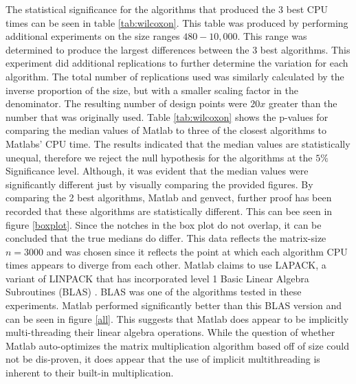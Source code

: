 \documentclass[sigconf]{acmart}
\begin{document}
The statistical significance for the algorithms that produced the 3 best CPU times can be seen in table \ref{tab:wilcoxon}. This table was produced by performing additional experiments on the size ranges $480-10,000$. This range was determined to produce the largest differences between the 3 best algorithms. This experiment did additional replications to further determine the variation for each algorithm. The total number of replications used was similarly calculated by the inverse proportion of the size, but with a smaller scaling factor in the denominator. The resulting number of design points were $20x$ greater than the number that was originally used. Table \ref{tab:wilcoxon} shows the p-values for comparing the median values of Matlab to three of the closest algorithms to Matlabs' CPU time. The results indicated that the median values are statistically unequal, therefore we reject the null hypothesis for the algorithms at the $5\%$ Significance level. Although, it was evident that the median values were significantly different just by visually comparing the provided figures. By comparing the 2 best algorithms, Matlab and genvect, further proof has been recorded that these algorithms are statistically different. This can bee seen in figure \ref{boxplot}. Since the notches in the box plot do not overlap, it can be concluded that the true medians do differ. This data reflects the matrix-size $n = 3000$ and was chosen since it reflects the point at which each algorithm CPU times appears to diverge from each other. Matlab claims to use LAPACK, a variant of LINPACK that has incorporated level 1 Basic Linear Algebra Subroutines (BLAS) \cite{matlabMethod}. BLAS was one of the algorithms tested in these experiments. Matlab performed significantly better than this BLAS version and can be seen in figure \ref{all}. This suggests that Matlab does appear to be implicitly multi-threading their linear algebra operations. While the question of whether Matlab auto-optimizes the matrix multiplication algorithm based off of size could not be dis-proven, it does appear that the use of implicit multithreading is inherent to their built-in multiplication.
\end{document}
